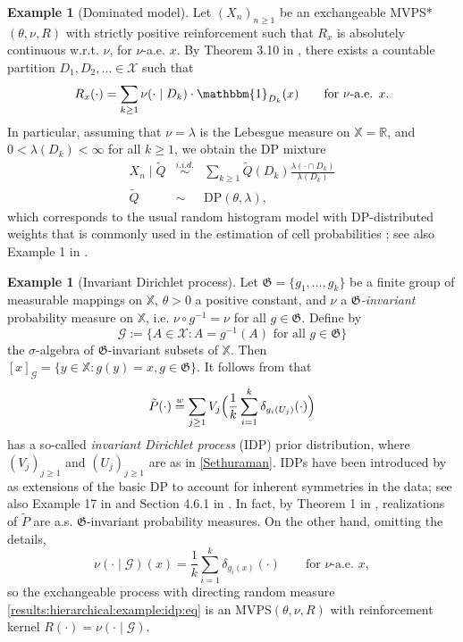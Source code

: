 \documentclass[a4paper]{article}
\theoremstyle{plain}
\theoremstyle{remark}
\theoremstyle{definition}
\newtheorem{example}[theorem]{Example}
\begin{document}
\begin{example}[Dominated model]\label{results:hierarchical:example:histogram}
Let $(X_n)_{n\geq1}$ be an exchangeable MVPS*$(\theta,\nu,R)$ with strictly positive reinforcement such that $R_x$ is absolutely continuous w.r.t. $\nu$, for $\nu$-a.e. $x$. By Theorem 3.10 in \cite{sariev2024}, there exists a countable partition $D_1,D_2,\ldots\in\mathcal{X}$ such that
\[R_x(\cdot)=\sum_{k\geq1}\nu(\cdot\mid D_k)\cdot\mathbbm{1}_{D_k}(x)\qquad\mbox{for }\nu\mbox{-a.e. }x.\]
In particular, assuming that $\nu=\lambda$ is the Lebesgue measure on $\mathbb{X}=\mathbb{R}$, and $0<\lambda(D_k)<\infty$ for all $k\geq1$, we obtain the DP mixture
\begin{eqnarray}
X_n\mid\tilde{Q} &\overset{i.i.d.}{\sim} & \sum_{k\geq1}\tilde{Q}(D_k)\frac{\lambda(\cdot\cap D_k)}{\lambda(D_k)} \nonumber\\ \tilde{Q} & \sim & \mbox{DP}(\theta,\lambda), \nonumber
\end{eqnarray}
which corresponds to the usual random histogram model with DP-distributed weights that is commonly used in the estimation of cell probabilities \citep{lo1984}; see also Example 1 in \cite{sariev2023sufficientness}.
\end{example}

\begin{example}[Invariant Dirichlet process]\label{results:hierarchical:example:idp}
Let $\mathfrak{G}=\{g_1,\ldots,g_k\}$ be a finite group of measurable mappings on $\mathbb{X}$, $\theta>0$ a positive constant, and $\nu$ a \textit{$\mathfrak{G}$-invariant} probability measure on $\mathbb{X}$, i.e. $\nu\circ g^{-1}=\nu$ for all $g\in\mathfrak{G}$. Define by
\[\mathcal{G}:=\{A\in\mathcal{X}:A=g^{-1}(A)\mbox{ for all }g\in\mathfrak{G}\}\]
the $\sigma$-algebra of $\mathfrak{G}$-invariant subsets of $\mathbb{X}$. Then $[x]_\mathcal{G}=\{y\in\mathbb{X}:g(y)=x,g\in\mathfrak{G}\}$. It follows from \cite[][Theorem 1]{tiwari1988} that
\begin{equation}\label{results:hierarchical:example:idp:eq}
\tilde{P}(\cdot)\overset{w}{=}\sum_{j\geq1}V_j\Bigl(\frac{1}{k}\sum_{i=1}^k\delta_{g_i(U_j)}(\cdot)\Bigr)
\end{equation}
has a so-called \textit{invariant Dirichlet process} (IDP) prior distribution, where $(V_j)_{j\geq1}$ and $(U_j)_{j\geq1}$ are as in \eqref{Sethuraman}. IDPs have been introduced by \cite{dalal1979} as extensions of the basic DP to account for inherent symmetries in the data; see also Example 17 in \cite{berti2023kernel} and Section 4.6.1 in \cite{ghosal2017}. In fact, by Theorem 1 in \cite{dalal1979}, realizations of $\tilde{P}$ are a.s. $\mathfrak{G}$-invariant probability measures. On the other hand, omitting the details,
\[\nu(\cdot\mid\mathcal{G})(x)=\frac{1}{k}\sum_{i=1}^k\delta_{g_i(x)}(\cdot)\qquad\mbox{for }\nu\mbox{-a.e. }x,\]
so the exchangeable process with directing random measure \eqref{results:hierarchical:example:idp:eq} is an MVPS$(\theta,\nu,R)$ with reinforcement kernel $R(\cdot)=\nu(\cdot\mid\mathcal{G})$.
\end{example}
\end{document}
